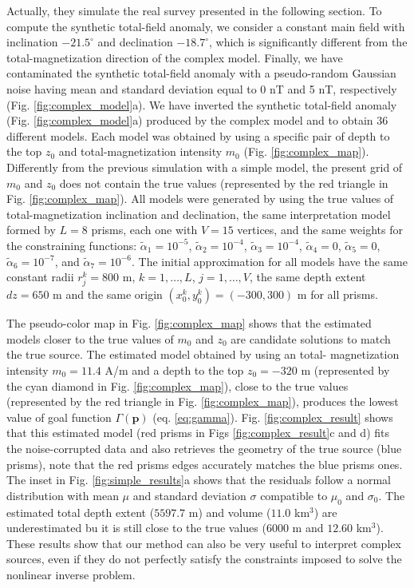Actually, they simulate the real survey presented in the following section. To compute the synthetic total-field anomaly, we consider a constant main field with inclination $ -21.5^\circ $ and declination $ -18.7^\circ $, which is significantly different from the total-magnetization direction of the complex model. Finally, we have
contaminated the synthetic total-field anomaly with a pseudo-random Gaussian noise having mean and standard deviation equal to 0 nT and 5 nT, respectively (Fig. \ref{fig:complex_model}a). We have inverted the synthetic total-field anomaly (Fig. \ref{fig:complex_model}a) produced by the complex model and to obtain 36 different models. Each model was obtained by using a specific pair of depth to the top $ z_0 $
and total-magnetization intensity $ m_0 $ (Fig. \ref{fig:complex_map}). Differently from the previous simulation with a simple model, the present grid of $ m_0 $ and $ z_0 $ does not contain the true values (represented by the red triangle in Fig. \ref{fig:complex_map}). All models were generated by using the true values of total-magnetization inclination and declination, the same interpretation model formed by $ L = 8 $ prisms, each one with $ V = 15 $ vertices, and the same weights for the constraining functions: $\tilde{\alpha}_1 = 10^{-5}$, $\tilde{\alpha}_2 = 10^{-4}$, $\tilde{\alpha}_3 = 10^{-4}$, $\tilde{\alpha}_4 = 0$, $\tilde{\alpha}_5 = 0$, $\tilde{\alpha}_6 = 10^{-7}$, and $\tilde{\alpha}_7 = 10^{-6}$. The initial approximation for all models have the same constant radii $ r^k_j = 800 $ m, $ k = 1, \dots, L $, $ j = 1, \dots, V $, the same depth extent $ dz = 650 $ m and the same origin $ (x^k_0, y^k_0) = (-300, 300) $ m for all prisms.

The pseudo-color map in Fig. \ref{fig:complex_map} shows that the estimated models closer to the true values of $ m_0 $ and $z_0$ are candidate solutions to match the true source. The estimated model obtained by using an total- magnetization intensity $ m_0 = 11.4 $ A/m and a depth to the top $ z_0 = -320 $ m (represented by the cyan diamond in Fig. \ref{fig:complex_map}), close to the true values (represented by the red triangle in Fig. \ref{fig:complex_map}), produces the lowest value of goal function $ \Gamma(\mathbf{p}) $ (eq. \ref{eq:gamma}). Fig. \ref{fig:complex_result} shows that this estimated model (red prisms in Figs \ref{fig:complex_result}c and d) fits the noise-corrupted data and also retrieves the geometry of the true source (blue prisms), note that the red prisms edges accurately matches the blue prisms ones. The inset in Fig. \ref{fig:simple_results}a shows that the residuals follow a normal distribution with mean $ \mu $ and standard deviation $ \sigma $ compatible to $ \mu_0 $ and $ \sigma_0 $. The estimated total depth extent ($ 5597.7 $ m) and volume ($ 11.0 $ km$^3 $) are underestimated bu it is still close to the true values ($ 6000 $ m and $ 12.60 $ km$^3 $). These results show that our method can also be very useful to interpret complex sources, even if they do not perfectly satisfy the constraints imposed to solve the nonlinear inverse problem.